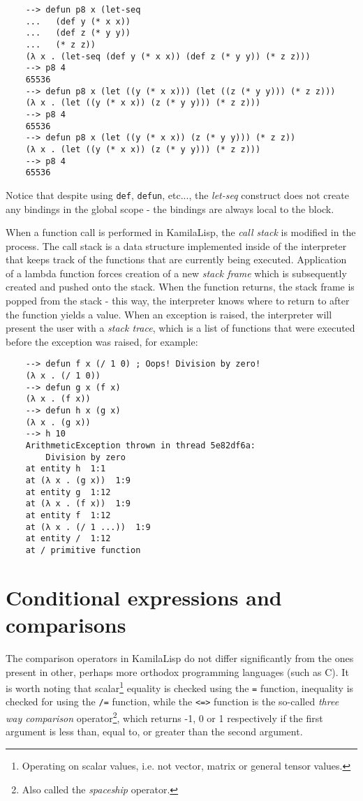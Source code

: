 \begin{Verbatim}
    --> defun p8 x (let-seq
    ...   (def y (* x x))
    ...   (def z (* y y))
    ...   (* z z))
    (λ x . (let-seq (def y (* x x)) (def z (* y y)) (* z z)))
    --> p8 4
    65536
    --> defun p8 x (let ((y (* x x))) (let ((z (* y y))) (* z z)))
    (λ x . (let ((y (* x x)) (z (* y y))) (* z z)))
    --> p8 4
    65536
    --> defun p8 x (let ((y (* x x)) (z (* y y))) (* z z))
    (λ x . (let ((y (* x x)) (z (* y y))) (* z z)))
    --> p8 4
    65536
\end{Verbatim}

Notice that despite using \verb|def|, \verb|defun|, etc..., the \textit{let-seq} construct does not create any bindings in the global scope - the bindings are always local to the block.

When a function call is performed in KamilaLisp, the \textit{call stack} is modified in the process. The call stack is a data structure implemented inside of the interpreter that keeps track of the functions that are currently being executed. Application of a lambda function forces creation of a new \textit{stack frame} which is subsequently created and pushed onto the stack. When the function returns, the stack frame is popped from the stack - this way, the interpreter knows where to return to after the function yields a value. When an exception is raised, the interpreter will present the user with a \textit{stack trace}, which is a list of functions that were executed before the exception was raised, for example:

\begin{Verbatim}
    --> defun f x (/ 1 0) ; Oops! Division by zero!
    (λ x . (/ 1 0))
    --> defun g x (f x)
    (λ x . (f x))
    --> defun h x (g x)
    (λ x . (g x))
    --> h 10
    ArithmeticException thrown in thread 5e82df6a:
        Division by zero
    at entity h  1:1
    at (λ x . (g x))  1:9
    at entity g  1:12
    at (λ x . (f x))  1:9
    at entity f  1:12
    at (λ x . (/ 1 ...))  1:9
    at entity /  1:12
    at / primitive function
\end{Verbatim}

\section{Conditional expressions and comparisons}

The comparison operators in KamilaLisp do not differ significantly from the ones present in other, perhaps more orthodox programming languages (such as C). It is worth noting that scalar\footnote{Operating on scalar values, i.e. not vector, matrix or general tensor values.} equality is checked using the \verb|=| function, inequality is checked for using the \verb|/=| function, while the \verb|<=>| function is the so-called \textit{three way comparison} operator\footnote{Also called the \textit{spaceship} operator.}, which returns -1, 0 or 1 respectively if the first argument is less than, equal to, or greater than the second argument.

